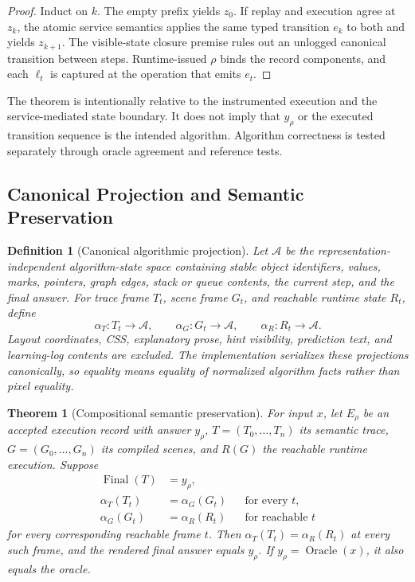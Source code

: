 \documentclass[letterpaper]{article}
\newtheorem{definition}{Definition}
\newtheorem{theorem}{Theorem}
\begin{document}
\begin{proof}
Induct on $k$. The empty prefix yields $z_0$. If replay and execution
agree at $z_k$, the atomic service semantics applies the same typed
transition $e_k$ to both and yields $z_{k+1}$. The visible-state closure
premise rules out an unlogged canonical transition between steps.
Runtime-issued $\rho$ binds the record components, and each $\ell_t$ is
captured at the operation that emits $e_t$.
\end{proof}

The theorem is intentionally relative to the instrumented execution
and the service-mediated state boundary. It does not imply that
$y_\rho$ or the executed transition sequence is the intended algorithm.
Algorithm correctness is tested separately through oracle agreement and
reference tests.

\subsection{Canonical Projection and Semantic Preservation}

\begin{definition}[Canonical algorithmic projection]
Let $\mathcal{A}$ be the representation-independent algorithm-state space containing stable object identifiers, values, marks, pointers, graph edges, stack or queue contents, the current step, and the final answer. For trace frame $T_t$, scene frame $G_t$, and reachable runtime state $R_t$, define
\[
\alpha_T:T_t\rightarrow\mathcal{A},\qquad
\alpha_G:G_t\rightarrow\mathcal{A},\qquad
\alpha_R:R_t\rightarrow\mathcal{A}.
\]
Layout coordinates, CSS, explanatory prose, hint visibility, prediction text, and learning-log contents are excluded. The implementation serializes these projections canonically, so equality means equality of normalized algorithm facts rather than pixel equality.
\end{definition}

\begin{theorem}[Compositional semantic preservation]
For input $x$, let $E_\rho$ be an accepted execution record with answer $y_\rho$, $T=(T_0,\ldots,T_n)$ its semantic trace, $G=(G_0,\ldots,G_n)$ its compiled scenes, and $R(G)$ the reachable runtime execution. Suppose
\[
\begin{aligned}
\operatorname{Final}(T)&=y_\rho,\\
\alpha_T(T_t)&=\alpha_G(G_t) &&\text{for every }t,\\
\alpha_G(G_t)&=\alpha_R(R_t) &&\text{for reachable }t
\end{aligned}
\]
for every corresponding reachable frame $t$. Then
$\alpha_T(T_t)=\alpha_R(R_t)$ at every such frame, and the rendered final answer equals $y_\rho$. If $y_\rho=\operatorname{Oracle}(x)$, it also equals the oracle.
\end{theorem}
\end{document}
